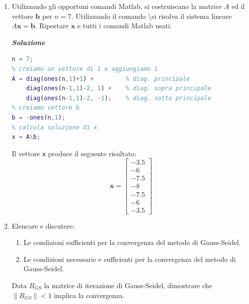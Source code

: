 \begin{enumerate}
    \item Utilizzando gli opportuni comandi Matlab, si costruiscano la matrice $A$ ed il vettore $\mathbf{b}$ per $n = 7$. Utilizzando il comando \textbackslash si risolva il sistema lineare $A\mathbf{x} = \mathbf{b}$. Riportare $\mathbf{x}$ e tutti i comandi Matlab usati.
    
    \textcolor{Green3}{\textbf{\emph{Soluzione}}}
    \begin{lstlisting}[language=MATLAB]
% dimensione di n
n = 7;
% creiamo un vettore di 1 e aggiungiamo 1
A = diag(ones(n,1)+1) +         % diag. principale
    diag(ones(n-1,1)-2, 1) +    % diag. sopra principale
    diag(ones(n-1,1)-2, -1);    % diag. sotto principale
% creiamo vettore b
b = -ones(n,1);
% calcola soluzione di x
x = A\b;\end{lstlisting}
Il vettore \texttt{x} produce il seguente risultato:
\begin{equation*}
    \mathbf{x} = \begin{bmatrix}
        -3.5 \\
        -6 \\
        -7.5 \\
        -8 \\
        -7.5 \\
        -6 \\
        -3.5
    \end{bmatrix}
\end{equation*}

    \item Elencare e discutere:
    \begin{enumerate}
        \item Le condizioni sufficienti per la convergenza del metodo di Gauss-Seidel.
        \item Le condizioni necessarie e sufficienti per la convergenza del metodo di Gauss-Seidel.
    \end{enumerate}
    Data $B_{GS}$ la matrice di iterazione di Gauss-Seidel, dimostrare che\break $\left\| B_{GS} \right\| < 1$ implica la convergenza.


\end{enumerate}
